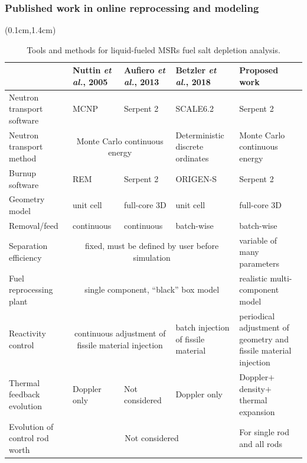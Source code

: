 \begin{frame}
\frametitle{Published work in online reprocessing and modeling}

  \begin{textblock*}{12.5cm}(0.1cm,1.4cm) %
	\begin{table}[t]
	\fontsize{6}{9}\selectfont
	\caption{Tools and methods for liquid-fueled \glspl{MSR} fuel salt depletion 
		analysis.}
		\vspace{-2mm}
	\begin{tabularx}{\textwidth}{X X X X p{3cm}} 
		\hline 
		&Nuttin \emph{et al.}, 2005 \cite{nuttin_potential_2005}& Aufiero \emph{et al.}, 
		2013 \cite{aufiero_extended_2013} & Betzler \emph{et al.}, 2018 
		\cite{betzler_fuel_2018}&Proposed work \\ 
		\hline
		Neutron transport software & \gls{MCNP} & Serpent 2 & SCALE6.2 & 
		Serpent 2 \\
		Neutron transport method & \multicolumn{2}{c}{Monte Carlo continuous 
		energy} & 
		Deterministic discrete ordinates & Monte Carlo continuous energy 
		\\
		Burnup software & REM & Serpent 2 & ORIGEN-S & Serpent 2 \\[5pt]
		Geometry model & unit cell & full-core 3D & unit cell & full-core 3D\\ 
		[5pt]
		Removal/feed  & continuous &continuous & batch-wise & batch-wise\\[5pt]
		Separation efficiency &\multicolumn{3}{c}{fixed, must be defined by user 
			before simulation} & variable of many parameters \\[5pt]
		Fuel reprocessing plant & \multicolumn{3}{c}{single component, ``black'' box 
			model} & realistic multi-component model \\[5pt]
		Reactivity control & \multicolumn{2}{c}{continuous adjustment of 
		fissile material injection} & batch injection of fissile material & 
		periodical adjustment of geometry and fissile material injection\\[5pt]
		Thermal feedback evolution & Doppler only & Not considered & 
		Doppler only & Doppler$+$density$+$thermal expansion\\[5pt]
		Evolution of control rod worth & \multicolumn{3}{c}{Not considered} & 
		For single rod and all rods \\
		\hline
	\end{tabularx}
	\label{tab:msr_codes}
\end{table}
\end{textblock*}

\end{frame}


